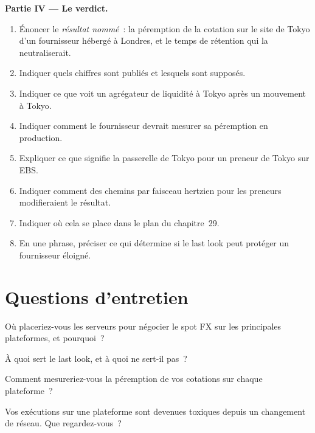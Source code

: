 \begin{problem}
\medskip\noindent\textbf{Partie IV --- Le verdict.}
\begin{enumerate}[resume]
\item Énoncer le \emph{résultat nommé}~: la péremption de la cotation sur le site de Tokyo d'un fournisseur hébergé à Londres, et le temps de rétention qui
  la neutraliserait.
\item Indiquer quels chiffres sont publiés et lesquels sont supposés.
\item Indiquer ce que voit un agrégateur de liquidité à Tokyo après un mouvement à Tokyo.
\item Indiquer comment le fournisseur devrait mesurer sa péremption en production.
\item Expliquer ce que signifie la passerelle de Tokyo pour un preneur de Tokyo sur EBS.
\item Indiquer comment des chemins par faisceau hertzien pour les preneurs modifieraient le résultat.
\item Indiquer où cela se place dans le plan du chapitre~29.
\item En une phrase, préciser ce qui détermine si le last look peut protéger un fournisseur éloigné.
\end{enumerate}
\end{problem}

\section{Questions d'entretien}

\begin{interviewq}\label{iq:nw:fx-connectivity:1}
Où placeriez-vous les serveurs pour négocier le spot FX sur les principales plateformes, et pourquoi~?
\end{interviewq}

\begin{interviewq}\label{iq:nw:fx-connectivity:2}
À quoi sert le last look, et à quoi ne sert-il pas~?
\end{interviewq}

\begin{interviewq}\label{iq:nw:fx-connectivity:3}
Comment mesureriez-vous la péremption de vos cotations sur chaque plateforme~?
\end{interviewq}

\begin{interviewq}\label{iq:nw:fx-connectivity:4}
Vos exécutions sur une plateforme sont devenues toxiques depuis un changement de réseau. Que regardez-vous~?
\end{interviewq}

